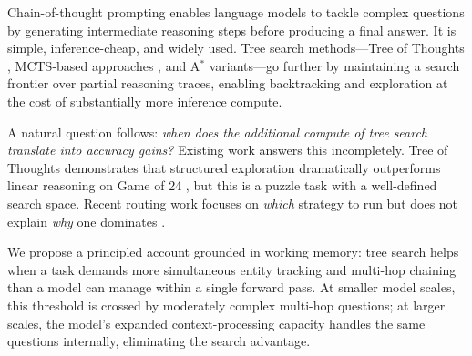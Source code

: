 \documentclass{article}
\newcommand{\astar}{A$^*$\xspace}
\begin{document}
Chain-of-thought prompting \citep{wei2023chainofthoughtpromptingelicitsreasoning} enables language models to tackle complex questions by generating intermediate reasoning steps before producing a final answer. It is simple, inference-cheap, and widely used. Tree search methods---Tree of Thoughts \citep{yao2023treethoughtsdeliberateproblem}, MCTS-based approaches \citep{zhang2024accessinggpt4levelmathematical}, and \astar variants---go further by maintaining a search frontier over partial reasoning traces, enabling backtracking and exploration at the cost of substantially more inference compute.

A natural question follows: \emph{when does the additional compute of tree search translate into accuracy gains?} Existing work answers this incompletely. Tree of Thoughts demonstrates that structured exploration dramatically outperforms linear reasoning on Game of 24 \citep{yao2023treethoughtsdeliberateproblem}, but this is a puzzle task with a well-defined search space. Recent routing work focuses on \emph{which} strategy to run but does not explain \emph{why} one dominates \citep{sui2025stopoverthinkingsurveyefficient}.

We propose a principled account grounded in working memory: tree search helps when a task demands more simultaneous entity tracking and multi-hop chaining than a model can manage within a single forward pass. At smaller model scales, this threshold is crossed by moderately complex multi-hop questions; at larger scales, the model's expanded context-processing capacity handles the same questions internally, eliminating the search advantage.
\end{document}
